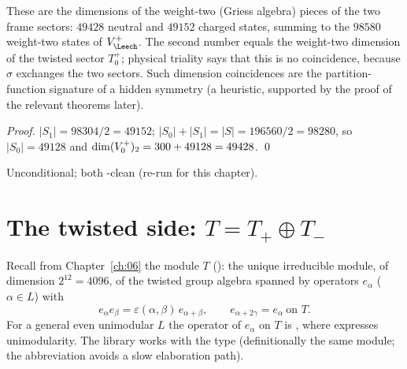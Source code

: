 \begin{physics}
These are the dimensions of the weight-two (Griess algebra) pieces of the two frame sectors: $49428$ neutral and $49152$ charged states, summing to the $98580$ weight-two states of $V_\Leech^+$. The second number equals the weight-two dimension of the twisted sector $T_0^+$; physical triality says that this is no coincidence, because $\sigma$ exchanges the two sectors. Such dimension coincidences are the partition-function signature of a hidden symmetry (a heuristic, supported by the proof of the relevant theorems later).
\end{physics}
\emph{Proof.}  $|S_1|=98304/2=49152$; $|S_0|+|S_1|=|S|=196560/2=98280$, so $|S_0|=49128$ and
$\dim(V_0^{+})_2=300+49128=49428$. \qed
\begin{status}Unconditional; both -clean (re-run for this chapter).\end{status}

\section{The twisted side: \texorpdfstring{$T=T_+\oplus T_-$}{T = T+ + T-}}\label{ch11:sec:twistedsplit}

Recall from Chapter~\ref{ch:06} the module $T$ (): the unique irreducible module, of
dimension $2^{12}=4096$, of the twisted group algebra spanned by operators $e_\alpha$ ($\alpha\in L$)
with
\begin{equation*}
  e_\alpha e_\beta=\varepsilon(\alpha,\beta)\,e_{\alpha+\beta},\qquad e_{\alpha+2\gamma}=e_\alpha\ \text{on }T .
\end{equation*}
For a general even unimodular $L$ the operator of $e_\alpha$ on $T$ is , where
 expresses unimodularity.  The library works with the type
 (definitionally the same module; the
abbreviation avoids a slow elaboration path).

